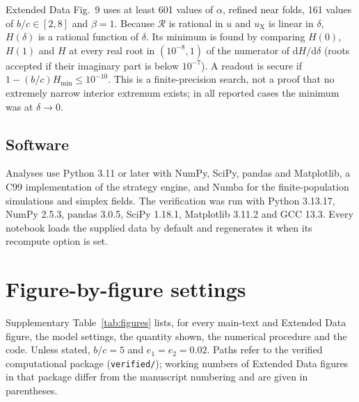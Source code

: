 \documentclass[fleqn,10pt]{article}
\theoremstyle{plain}
\theoremstyle{remark}
\newcommand{\EDSecurity}{9}
\newcommand{\Rm}{\mathcal R}
\begin{document}
Extended Data Fig.~\EDSecurity{} uses at least 601 values of $\alpha$, refined
near folds, 161 values of $b/c\in[2,8]$ and $\beta=1$. Because $\Rm$ is rational
in $u$ and $u_{\mathrm X}$ is linear in $\delta$, $H(\delta)$ is a rational function
of $\delta$. Its minimum is found by comparing $H(0)$, $H(1)$ and $H$ at every
real root in $(10^{-8},1)$ of the numerator of $\mathrm dH/\mathrm d\delta$
(roots accepted if their imaginary part is below $10^{-7}$). A readout is
secure if $1-(b/c)H_{\min}\le10^{-10}$. This is a finite-precision search, not a
proof that no extremely narrow interior extremum exists; in all reported
cases the minimum was at $\delta\to0$.

\subsection{Software}
Analyses use Python 3.11 or later with NumPy, SciPy, pandas and Matplotlib, a
C99 implementation of the strategy engine, and Numba for the finite-population
simulations and simplex fields. The verification was run with Python 3.13.17,
NumPy 2.5.3, pandas 3.0.5, SciPy 1.18.1, Matplotlib 3.11.2 and GCC 13.3. Every
notebook loads the supplied data by default and regenerates it when its
recompute option is set.

\section{Figure-by-figure settings}
\label{sec:figures}

Supplementary Table~\ref{tab:figures} lists, for every main-text and Extended
Data figure, the model settings, the quantity shown, the numerical procedure and
the code. Unless stated, $b/c=5$ and $e_1=e_2=0.02$. Paths refer to the verified
computational package (\texttt{verified/}); working numbers of Extended Data
figures in that package differ from the manuscript numbering and are given in
parentheses.
\end{document}
